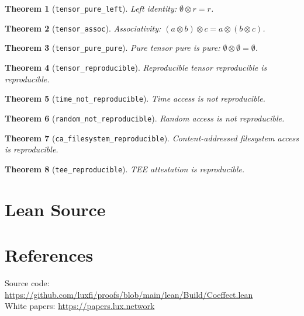 \documentclass[11pt]{article}
\newtheorem{theorem}{Theorem}
\begin{document}
\begin{theorem}[\texttt{tensor\_pure\_left}]
Left identity: $\emptyset \otimes r = r$.
\end{theorem}

\begin{theorem}[\texttt{tensor\_assoc}]
Associativity: $(a \otimes b) \otimes c = a \otimes (b \otimes c)$.
\end{theorem}

\begin{theorem}[\texttt{tensor\_pure\_pure}]
Pure tensor pure is pure: $\emptyset \otimes \emptyset = \emptyset$.
\end{theorem}

\begin{theorem}[\texttt{tensor\_reproducible}]
Reproducible tensor reproducible is reproducible.
\end{theorem}

\begin{theorem}[\texttt{time\_not\_reproducible}]
Time access is not reproducible.
\end{theorem}

\begin{theorem}[\texttt{random\_not\_reproducible}]
Random access is not reproducible.
\end{theorem}

\begin{theorem}[\texttt{ca\_filesystem\_reproducible}]
Content-addressed filesystem access is reproducible.
\end{theorem}

\begin{theorem}[\texttt{tee\_reproducible}]
TEE attestation is reproducible.
\end{theorem}


\section{Lean Source}


\section{References}
\noindent Source code: \url{https://github.com/luxfi/proofs/blob/main/lean/Build/Coeffect.lean}\\
\noindent White papers: \url{https://papers.lux.network}
\end{document}
